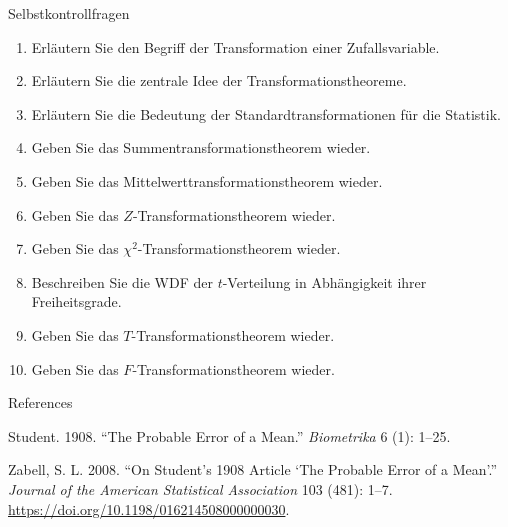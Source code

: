 \documentclass[
  8pt,
  ignorenonframetext,
]{beamer}
\newlength{\cslhangindent}
\newlength{\cslentryspacingunit} %
\newenvironment{CSLReferences}[2] %
 {%
  \setlength{\parindent}{0pt}
  \ifodd #1
  \let\oldpar\par
  \def\par{\hangindent=\cslhangindent\oldpar}
  \fi
  \setlength{\parskip}{#2\cslentryspacingunit}
 }%
 {}
\begin{document}
\begin{frame}{Selbstkontrollfragen}
\protect\hypertarget{selbstkontrollfragen}{}
\small
{}
\begin{enumerate}
\item Erläutern Sie den Begriff der Transformation einer Zufallsvariable.
\item Erläutern Sie die zentrale Idee der Transformationstheoreme.
\item Erläutern Sie die Bedeutung der Standardtransformationen für die Statistik.
\item Geben Sie das Summentransformationstheorem wieder.
\item Geben Sie das Mittelwerttransformationstheorem wieder.
\item Geben Sie das $Z$-Transformationstheorem wieder.
\item Geben Sie das $\chi^2$-Transformationstheorem wieder.
\item Beschreiben Sie die WDF der $t$-Verteilung in Abhängigkeit ihrer Freiheitsgrade.
\item Geben Sie das $T$-Transformationstheorem wieder.
\item Geben Sie das $F$-Transformationstheorem wieder.
\end{enumerate}
\end{frame}

\begin{frame}{References}
\protect\hypertarget{references}{}
\footnotesize

\hypertarget{refs}{}
\begin{CSLReferences}{1}{0}
\leavevmode{}%
Student. 1908. {``The {Probable Error} of a {Mean}.''} \emph{Biometrika}
6 (1): 1--25.

\leavevmode{}%
Zabell, S. L. 2008. {``On {Student}'s 1908 {Article} {`{The Probable
Error} of a {Mean}'}.''} \emph{Journal of the American Statistical
Association} 103 (481): 1--7.
\url{https://doi.org/10.1198/016214508000000030}.

\end{CSLReferences}
\end{frame}
\end{document}
